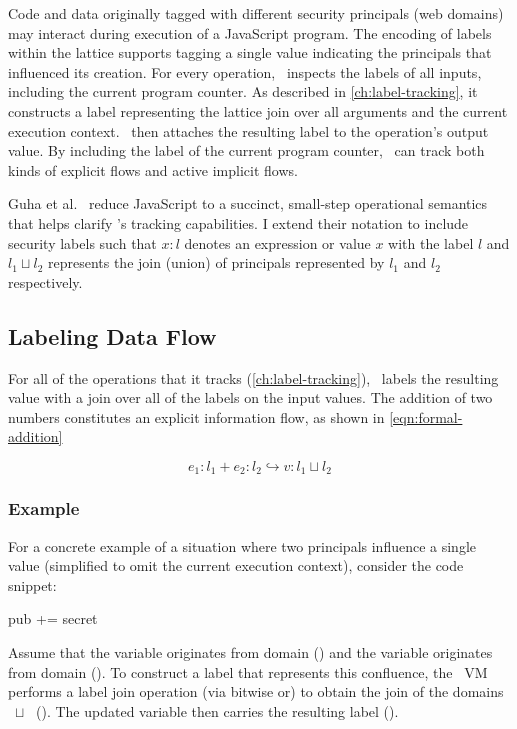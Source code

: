 Code and data originally tagged with different security principals (web domains) may interact during execution of a JavaScript program.
The encoding of labels within the lattice supports tagging a single value indicating the principals that influenced its creation.
For every operation, \JitFlow\ inspects the labels of all inputs, including the current program counter.
As described in \autoref{ch:label-tracking}, it constructs a label representing the lattice join over all arguments and the current execution context.
\JitFlow\ then attaches the resulting label to the operation's output value.
By including the label of the current program counter, \JitFlow\ can track both kinds of explicit flows and active implicit flows.

Guha et al.~\cite{guha.etal+10} reduce JavaScript to a succinct, small-step operational semantics that helps clarify \FlowCore's tracking capabilities.
I extend their notation to include security labels such that $x:l$ denotes an expression or value $x$ with the label $l$ and $l_1 \sqcup l_2$ represents the join (union) of principals represented by $l_1$ and $l_2$ respectively.

\subsection{Labeling Data Flow}

For all of the operations that it tracks (\autoref{ch:label-tracking}), \FlowCore\ labels the resulting value with a join over all of the labels on the input values.
The addition of two numbers constitutes an explicit information flow, as shown in \autoref{eqn:formal-addition}

\begin{equation}
\label{eqn:formal-addition}
  e_1:l_1 + e_2:l_2 \hookrightarrow v:l_1 \sqcup l_2
\end{equation}

\subsubsection{Example}

For a concrete example of a situation where two principals influence a single value (simplified to omit the current execution context), consider the code snippet:

\begin{snippet}
pub += secret
\end{snippet}

Assume that the variable  originates from domain  () and the variable  originates from domain  ().
To construct a label that represents this confluence, the \JitFlow\ VM performs a label join operation (via bitwise or) to obtain the join of the domains ~$\sqcup$~ ().
The updated variable  then carries the resulting label ().

